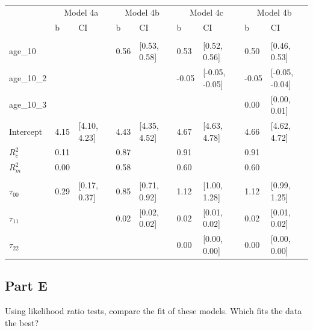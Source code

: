 \documentclass[]{article}
\begin{document}
\begin{table}[H]
\centering
\begin{tabular}{lllllllll}
\toprule
\multicolumn{1}{c}{ } & \multicolumn{2}{c}{Model 4a} & \multicolumn{2}{c}{Model 4b} & \multicolumn{2}{c}{Model 4c} & \multicolumn{2}{c}{Model 4b} \\
\cmidrule(l{2pt}r{2pt}){2-3} \cmidrule(l{2pt}r{2pt}){4-5} \cmidrule(l{2pt}r{2pt}){6-7} \cmidrule(l{2pt}r{2pt}){8-9}
 & b & CI & b & CI & b & CI & b & CI\\
\midrule
\addlinespace[0.3em]
\multicolumn{9}{l}{\textbf{Fixed}}\\
\hspace{1em}age\_10 &  &  & 0.56 & [0.53, 0.58] & 0.53 & [0.52, 0.56] & 0.50 & [0.46, 0.53]\\
\hspace{1em}age\_10\_2 &  &  &  &  & -0.05 & [-0.05, -0.05] & -0.05 & [-0.05, -0.04]\\
\hspace{1em}age\_10\_3 &  &  &  &  &  &  & 0.00 & [0.00, 0.01]\\
\hspace{1em}Intercept & 4.15 & [4.10, 4.23] & 4.43 & [4.35, 4.52] & 4.67 & [4.63, 4.78] & 4.66 & [4.62, 4.72]\\
$R^2_c$ & 0.11 &  & 0.87 &  & 0.91 &  & 0.91 & \\
$R^2_m$ & 0.00 &  & 0.58 &  & 0.60 &  & 0.60 & \\
\addlinespace[0.3em]
\multicolumn{9}{l}{\textbf{Random}}\\
\hspace{1em}$\tau_{00}$ & 0.29 & [0.17, 0.37] & 0.85 & [0.71, 0.92] & 1.12 & [1.00, 1.28] & 1.12 & [0.99, 1.25]\\
\hspace{1em}$\tau_{11}$ &  &  & 0.02 & [0.02, 0.02] & 0.02 & [0.01, 0.02] & 0.02 & [0.01, 0.02]\\
\hspace{1em}$\tau_{22}$ &  &  &  &  & 0.00 & [0.00, 0.00] & 0.00 & [0.00, 0.00]\\
\bottomrule
\end{tabular}
\end{table}

\subsection{Part E}\label{part-e}

Using likelihood ratio tests, compare the fit of these models. Which
fits the data the best?
\end{document}
